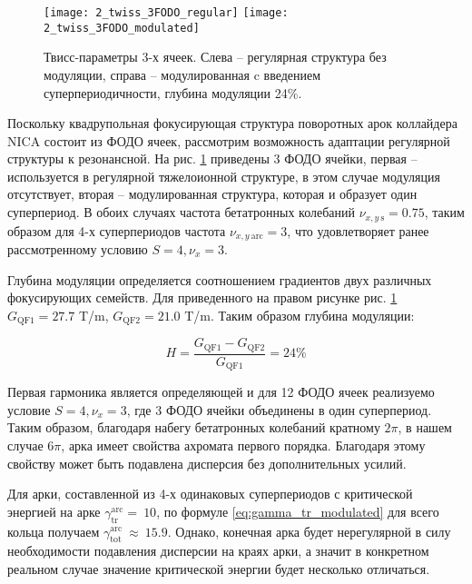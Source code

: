 \begin{figure}
   \texttt{[image: 2\_twiss\_3FODO\_regular]}
   \texttt{[image: 2\_twiss\_3FODO\_modulated]}
   \caption{Твисс-параметры 3-х ячеек. Слева – регулярная структура без модуляции, справа – модулированная c введением суперпериодичности, глубина модуляции 24\%.}
   \label{fig:twiss_3FODO}
\end{figure}

\par Поскольку квадрупольная фокусирующая структура поворотных арок коллайдера NICA состоит из ФОДО ячеек, рассмотрим возможность адаптации регулярной структуры к резонансной. На рис. \ref{fig:twiss_3FODO} приведены 3 ФОДО ячейки, первая – используется в регулярной тяжелоионной структуре, в этом случае модуляция отсутствует, вторая – модулированная структура,  которая и образует один суперпериод. В обоих случаях частота бетатронных колебаний $\nu_{x,y\ \text{s}}=0.75$, таким образом для 4-х суперпериодов частота $\nu_{x,y\ \text{arc}}=3$, что удовлетворяет ранее рассмотренному условию $S=4, \nu_x=3$.

Глубина модуляции определяется соотношением градиентов двух различных фокусирующих семейств. Для приведенного на правом рисунке рис. \ref{fig:twiss_3FODO} $G_{\textrm{QF1}}=27.7$ T/m, $G_{\textrm{QF2}}=21.0$ T/m. Таким образом глубина модуляции:

\begin{equation}
H=\frac{G_{\textrm{QF1}}-G_{\textrm{QF2}}}{G_{\textrm{QF1}}}=24\%
\label {eq:modulated_coeff}
\end{equation}

\par Первая гармоника является определяющей и для 12 ФОДО ячеек реализуемо условие $S=4, \nu_x=3$, где 3 ФОДО ячейки объединены в один суперпериод. Таким образом, благодаря набегу бетатронных колебаний кратному $2\pi$, в нашем случае $6\pi$, арка имеет свойства ахромата первого порядка. Благодаря этому свойству может быть подавлена дисперсия без дополнительных усилий.

\par Для арки, составленной из 4-х одинаковых суперпериодов с критической энергией  на арке $\gamma_{\text{tr}}^{\text{arc}}=\ 10$, по формуле \ref{eq:gamma_tr_modulated} для всего кольца получаем $\gamma_{\text{tot}}^{\text{arc}}\ \approx\ 15.9$. Однако, конечная арка будет нерегулярной в силу необходимости подавления дисперсии на краях арки, а значит в конкретном реальном случае значение критической энергии будет несколько отличаться.


